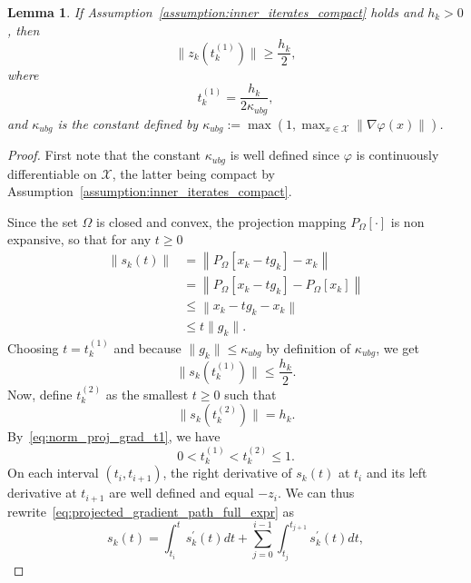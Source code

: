 \documentclass{article}
\numberwithin{equation}{section}
\newcommand{\calX}{{\mathcal{X}}}
\newcommand{\proj}[2]{P_{#1} \left[ {#2} \right]} %
\theoremstyle{plain}
\newtheorem{lemma}[theorem]{Lemma}
\begin{document}
	\begin{lemma}\label{lemma:majoration_reduced_gradient_norm}
		If Assumption~\ref{assumption:inner_iterates_compact} holds and $h_k>0$, then 
		\[\|z_k(t_k^{(1)})\| \ge \dfrac{h_k}{2},\]
		where \[t_k^{(1)}=\frac{h_k}{2\kappa_{ubg}},\]
		and $\kappa_{ubg}$ is the constant defined by $\kappa_{ubg} := \max\left(1, \max_{x \in \calX} \|\nabla \varphi(x)\|\right)$.
	\end{lemma}
	
	\begin{proof} 
		First note that the constant $\kappa_{ubg}$ is well defined since $\varphi$ is continuously differentiable on $\calX$, the latter being compact by Assumption~\ref{assumption:inner_iterates_compact}.
		
		Since the set $\Omega$ is closed and convex, the projection mapping $\proj{\Omega}{\cdot}$ is non expansive, so that for any $t\ge 0$
		\begin{equation*}
			\begin{split}
				\left\| s_k\left(t\right) \right\| & = \left\| \proj{\Omega}{x_k-tg_k}-x_k\right\| \\
				& = \left\| \proj{\Omega}{x_k-tg_k}-\proj{\Omega}{x_k}\right\| \\
				& \le \left\| x_k-tg_k-x_k\right\|\\
				& \le t\|g_k\|.
			\end{split}
		\end{equation*}
		Choosing $t=t_k^{(1)}$ and because $\|g_k\|\le \kappa_{ubg}$ by definition of $\kappa_{ubg}$, we get
		\begin{equation}\label{eq:norm_proj_grad_t1}
			\| s_k(t_k^{(1)})\| \le \dfrac{h_k}{2}.
		\end{equation}
		Now, define $t_k^{(2)}$ as the smallest $t\ge 0$ such that
		\begin{equation}\label{eq:def_t2}
			\|s_k(t_k^{(2)})\| = h_k.
		\end{equation}
		By~\eqref{eq:norm_proj_grad_t1}, we have
		\begin{equation}\label{eq:t1_leq_t2}
			0 < t_k^{(1)} < t_k^{(2)} \le 1.
		\end{equation}
		On each interval $(t_i,t_{i+1})$, the right derivative of $s_k(t)$ at $t_i$ and its left derivative at $t_{i+1}$ are well defined and equal $-z_i$. We can thus rewrite~\eqref{eq:projected_gradient_path_full_expr} as
		\begin{equation*}
			s_k(t) = \int_{t_i}^{t} s_k^\prime(t)dt + \sum_{j=0}^{i-1} \int_{t_j}^{t_{j+1}} s_k^\prime(t)dt,

\end{equation*}
\end{proof}
\end{document}
